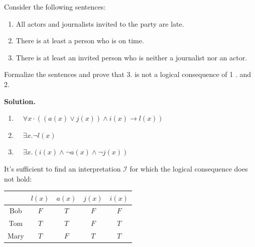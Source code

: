 \begin{example}%
Consider the following sentences:

\begin{enumerate}
  \item All actors and journalists invited to the party are late.
  \item There is at least a person who is on time.
  \item There is at least an invited person who is neither a journalist nor an actor.
\end{enumerate}

Formalize the sentences and prove that 3. is not a logical consequence of 1 . and 2.

{\color{sol}
\textbf{Solution.}
\begin{enumerate}
  \item $\quad \forall x \cdot((a(x) \vee j(x)) \wedge i(x) \rightarrow l(x))$
  \item $\quad \exists x . \neg l(x)$
  \item $\quad \exists x .(i(x) \wedge \neg a(x) \wedge \neg j(x))$
\end{enumerate}

It's sufficient to find an interpretation $\mathcal{I}$ for which the logical consequence does not hold:

\begin{center}
\begin{tabular}{|c|c|c|c|c|}
\hline
 & $l(x)$ & $a(x)$ & $j(x)$ & $i(x)$ \\
\hline\hline
Bob & $F$ & $T$ & $F$ & $F$ \\
Tom & $T$ & $T$ & $F$ & $T$ \\
Mary & $T$ & $F$ & $T$ & $T$ \\
\hline
\end{tabular}
\end{center}
}

\end{example}



